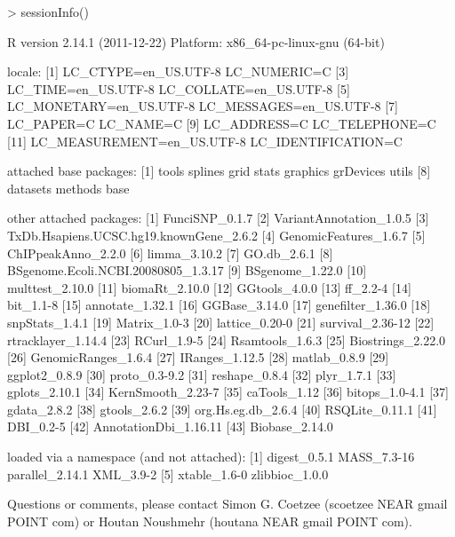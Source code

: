 \documentclass[a4paper]{article}
\begin{document}
\newpage

\begin{Schunk}
\begin{Sinput}
> sessionInfo()
\end{Sinput}
\begin{Soutput}
R version 2.14.1 (2011-12-22)
Platform: x86_64-pc-linux-gnu (64-bit)

locale:
 [1] LC_CTYPE=en_US.UTF-8       LC_NUMERIC=C              
 [3] LC_TIME=en_US.UTF-8        LC_COLLATE=en_US.UTF-8    
 [5] LC_MONETARY=en_US.UTF-8    LC_MESSAGES=en_US.UTF-8   
 [7] LC_PAPER=C                 LC_NAME=C                 
 [9] LC_ADDRESS=C               LC_TELEPHONE=C            
[11] LC_MEASUREMENT=en_US.UTF-8 LC_IDENTIFICATION=C       

attached base packages:
 [1] tools     splines   grid      stats     graphics  grDevices utils    
 [8] datasets  methods   base     

other attached packages:
 [1] FunciSNP_0.1.7                         
 [2] VariantAnnotation_1.0.5                
 [3] TxDb.Hsapiens.UCSC.hg19.knownGene_2.6.2
 [4] GenomicFeatures_1.6.7                  
 [5] ChIPpeakAnno_2.2.0                     
 [6] limma_3.10.2                           
 [7] GO.db_2.6.1                            
 [8] BSgenome.Ecoli.NCBI.20080805_1.3.17    
 [9] BSgenome_1.22.0                        
[10] multtest_2.10.0                        
[11] biomaRt_2.10.0                         
[12] GGtools_4.0.0                          
[13] ff_2.2-4                               
[14] bit_1.1-8                              
[15] annotate_1.32.1                        
[16] GGBase_3.14.0                          
[17] genefilter_1.36.0                      
[18] snpStats_1.4.1                         
[19] Matrix_1.0-3                           
[20] lattice_0.20-0                         
[21] survival_2.36-12                       
[22] rtracklayer_1.14.4                     
[23] RCurl_1.9-5                            
[24] Rsamtools_1.6.3                        
[25] Biostrings_2.22.0                      
[26] GenomicRanges_1.6.4                    
[27] IRanges_1.12.5                         
[28] matlab_0.8.9                           
[29] ggplot2_0.8.9                          
[30] proto_0.3-9.2                          
[31] reshape_0.8.4                          
[32] plyr_1.7.1                             
[33] gplots_2.10.1                          
[34] KernSmooth_2.23-7                      
[35] caTools_1.12                           
[36] bitops_1.0-4.1                         
[37] gdata_2.8.2                            
[38] gtools_2.6.2                           
[39] org.Hs.eg.db_2.6.4                     
[40] RSQLite_0.11.1                         
[41] DBI_0.2-5                              
[42] AnnotationDbi_1.16.11                  
[43] Biobase_2.14.0                         

loaded via a namespace (and not attached):
[1] digest_0.5.1    MASS_7.3-16     parallel_2.14.1 XML_3.9-2      
[5] xtable_1.6-0    zlibbioc_1.0.0 
\end{Soutput}
\end{Schunk}
Questions or comments, please contact Simon G. Coetzee (scoetzee NEAR gmail 
 POINT com) or Houtan Noushmehr (houtana NEAR gmail POINT com).
\end{document}
